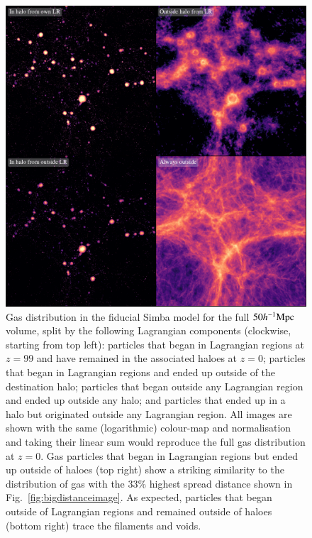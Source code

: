 \documentclass[fleqn,usenatbib]{mnras}
\newcommand{\hmpc}{h^{-1}{\rm Mpc}}
\newcommand{\simba}{{\sc Simba}}
\begin{document}
\begin{figure}
    \centering
    \vspace{1cm}
    \includegraphics{figures/s50j7kAHF/four_images_magma_AHF.pdf}
    \caption{Gas distribution in the fiducial \simba{} model for the full
    $50\hmpc{}$ volume, split by the following Lagrangian components
    (clockwise, starting from top left): particles that began in Lagrangian
    regions at $z=99$ and have remained in the associated haloes at $z=0$;
    particles that began in Lagrangian regions and ended up outside of the
    destination halo; particles that began outside any Lagrangian region and
    ended up outside any halo; and particles that ended up in a halo but
    originated outside any Lagrangian region. All images are shown with the
    same (logarithmic) colour-map and normalisation and taking their linear
    sum would reproduce the full gas distribution at $z=0$. Gas particles
    that began in Lagrangian regions but ended up outside of haloes (top
    right) show a striking similarity to the distribution of gas with the
    33\% highest spread distance shown in Fig.~\ref{fig:bigdistanceimage}.
    As expected, particles that began outside of Lagrangian regions and
    remained outside of haloes (bottom right) trace the filaments and voids.}
    \vspace{1cm}
    \label{fig:lrtransfer}
\end{figure}
\end{document}

